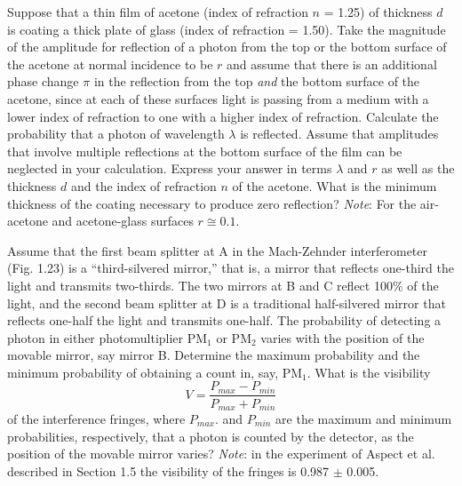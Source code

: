 \documentclass[12pt,letterpaper]{hmcpset}
\begin{document}
	\begin{problem}[T1.25:]
		Suppose that a thin film of acetone (index of refraction $n$ = 1.25) of thickness $d$ is coating a thick plate of glass (index of refraction = 1.50).
		Take the magnitude of the amplitude for reflection of a photon from the top or the bottom surface of the acetone at normal incidence to be $r$ and assume that there is an additional phase change $\pi$ in the reflection from the top \textit{and} the bottom surface of the acetone, since at each of these surfaces light is passing from a medium with a lower index of refraction to one with a higher index of refraction.
		Calculate the probability that a photon of wavelength $\lambda$ is reflected. Assume that amplitudes that involve multiple reflections at the bottom surface of the film can be neglected in your calculation.
		Express your answer in terms $\lambda$ and $r$ as well as the thickness $d$ and the index of refraction $n$ of the acetone.
		What is the minimum thickness of the coating necessary to produce zero reflection?
		\textit{Note}: For the air-acetone and acetone-glass surfaces $r \cong 0.1$.
	\end{problem}
	\clearpage



	\begin{problem}[T1.26:]
		Assume that the first beam splitter at A in the Mach-Zehnder interferometer (Fig. 1.23) is a ``third-silvered mirror,'' that is, a mirror that reflects one-third the light and transmits two-thirds.
		The two mirrors at B and C reflect 100\% of the light, and the second beam splitter at D is a traditional half-silvered mirror that reflects one-half the light and transmits one-half.
		The probability of detecting a photon in either photomultiplier PM$_1$ or PM$_2$ varies with the position of the movable mirror, say mirror B.
		Determine the maximum probability and the minimum probability of obtaining a count in, say, PM$_1$.
		What is the visibility
		\[V = \frac{P_{max} - P_{min}}{P_{max} + P_{min}}\]
		of the interference fringes, where $P_{max}$. and $P_{min}$ are the maximum and minimum probabilities, respectively, that a photon is counted by the detector, as the position of the movable mirror varies?
		\textit{Note}: in the experiment of Aspect et al. described in Section 1.5 the visibility of the fringes is 0.987 $\pm$ 0.005.
	\end{problem}
	\clearpage
\end{document}
